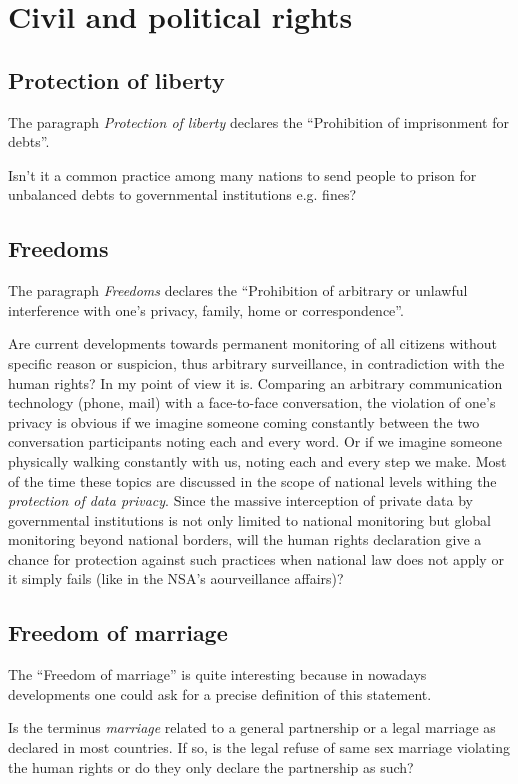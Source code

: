 \section{Civil and political rights}
\subsection{Protection of liberty}
The paragraph \emph{Protection of liberty} declares the ``Prohibition of
imprisonment for debts''.
\cite[p. 20]{tfohr}

Isn't it a common practice among many nations to send people to prison for
unbalanced debts to governmental institutions e.g. fines?
\cite{busse}

\subsection{Freedoms}
The paragraph \emph{Freedoms} declares the ``Prohibition of arbitrary or
unlawful interference with one's privacy, family, home or correspondence''.
\cite[p. 20]{tfohr}

Are current developments towards permanent monitoring of all citizens without
specific reason or suspicion, thus arbitrary surveillance, in contradiction
with the human rights? In my point of view it is. Comparing an arbitrary
communication technology (phone, mail) with a face-to-face conversation, the
violation of one's privacy is obvious if we imagine someone coming constantly
between the two conversation participants noting each and every word. Or if we
imagine someone physically walking constantly with us, noting each and every
step we make. Most of the time these topics are discussed in the scope of
national levels withing the \emph{protection of data privacy}. Since the
massive interception of private data by governmental institutions is not only
limited to national monitoring but global monitoring beyond national borders,
will the human rights declaration give a chance for protection against such
practices when national law does not apply or it simply fails (like in the
NSA's aourveillance affairs)?
\cite{nsa}

\subsection{Freedom of marriage}
The ``Freedom of marriage'' is quite interesting because in nowadays
developments one could ask for a precise definition of this statement.
\cite[p. 20]{tfohr}

Is the terminus \emph{marriage} related to a general partnership or a legal
marriage as declared in most countries. If so, is the legal refuse of same
sex marriage violating the human rights or do they only declare the
partnership as such?

